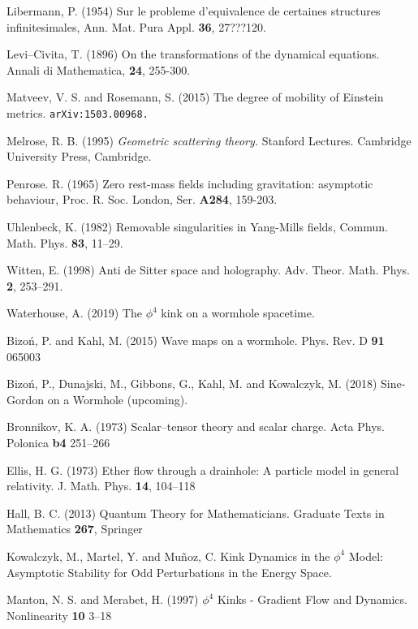 \begin{thebibliography}{}
Libermann, P. (1954) Sur le probleme d'equivalence de certaines structures infinitesimales, Ann.
Mat. Pura Appl. {\bf 36}, 27???120.


 Levi--Civita, T. (1896) On the transformations of the 
dynamical equations. Annali di Mathematica, {\bf 24}, 255-300.

 Matveev, V. S. and Rosemann, S. (2015)
The degree of mobility of Einstein metrics.
{\tt arXiv:1503.00968.}


Melrose, R. B. (1995)
{\em Geometric scattering theory.} Stanford Lectures. Cambridge University Press,
Cambridge.

Penrose. R. (1965) Zero rest-mass fields including gravitation: asymptotic behaviour, Proc. R. 
Soc. London, Ser. {\bf A284}, 159-203.

 Uhlenbeck, K. (1982) Removable singularities in Yang-Mills fields,
Commun. Math. Phys. {\bf 83}, 11--29.

 Witten, E. (1998)
Anti de Sitter space and holography. Adv. Theor. Math. Phys. {\bf 2}, 253--291.


 Waterhouse, A. (2019)
The $\phi^4$ kink on a wormhole spacetime.

 Bizo\'n, P. and Kahl, M. (2015)
Wave maps on a wormhole. Phys. Rev. D {\bf 91} 065003

 Bizo\'n, P., Dunajski, M., Gibbons, G., Kahl, M. and Kowalczyk, M. (2018) Sine-Gordon on a Wormhole (upcoming).

 Bronnikov, K. A. (1973)
Scalar--tensor theory and scalar charge. Acta Phys. Polonica {\bf b4} 251--266

 Ellis, H. G. (1973)
Ether flow through a drainhole: A particle model in general relativity. J. Math. Phys. {\bf 14}, 104--118

 Hall, B. C. (2013)
Quantum Theory for Mathematicians. Graduate Texts in Mathematics {\bf 267}, Springer

 Kowalczyk, M., Martel, Y. and Mu\~noz, C.
Kink Dynamics in the $\phi^4$ Model: Asymptotic Stability for Odd Perturbations in the Energy Space. 

 Manton, N. S. and Merabet, H. (1997)
$\phi^4$ Kinks - Gradient Flow and Dynamics. Nonlinearity {\bf 10} 3--18


\end{thebibliography}
